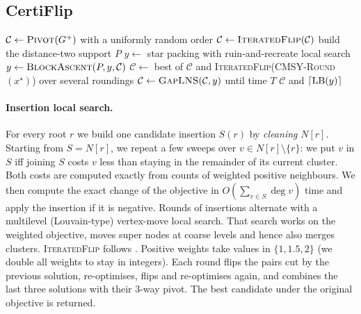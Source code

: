 \subsection{CertiFlip}\label{sec:algo}

\begin{algorithm}[t]
\caption{CertiFlip$(G^+,T)$}\label{alg:certiflip}
\begin{algorithmic}[1]
\State $\mathcal C\gets\textsc{Pivot}(G^+)$ with a uniformly random order
\State $\mathcal C\gets\textsc{IteratedFlip}(\mathcal C)$ 
\State build the distance-two support $P$
\State $y\gets$ star packing with ruin-and-recreate local search 
\State $y\gets\textsc{BlockAscent}(P,y,\mathcal C)$ 
  \State $\mathcal C\gets$ best of $\mathcal C$ and \textsc{IteratedFlip}(\textsc{CMSY-Round}$(x^\star)$) over several roundings
\EndIf
\State $\mathcal C\gets\textsc{GapLNS}(\mathcal C,y)$ until time $T$
\State \Return $\mathcal C$ and $\lceil\mathrm{LB}(y)\rceil$ 
\end{algorithmic}
\end{algorithm}

\paragraph{Insertion local search.}  For every root $r$ we build one candidate
insertion $S(r)$ by \emph{cleaning} $N[r]$.  Starting from $S=N[r]$, we
repeat a few sweeps over $v\in N[r]\setminus\{r\}$: we put $v$ in $S$ iff
joining $S$ costs $v$ less than staying in the remainder of its current
cluster.  Both costs are computed exactly from counts of weighted positive
neighbours.  We then compute the exact change of the objective in
$O(\sum_{v\in S}\deg v)$ time and apply the insertion if it is negative.
Rounds of insertions alternate with a multilevel (Louvain-type) vertex-move
local search.  That search works on the weighted objective, moves super nodes
at coarse levels and hence also merges clusters.  \textsc{IteratedFlip}
follows \citet{CohenAddadLPTYZ24}.  Positive weights take values in
$\{1,1.5,2\}$ (we double all weights to stay in integers).  Each round flips
the pairs cut by the previous solution, re-optimises, flips and re-optimises
again, and combines the last three solutions with their $3$-way pivot.  The
best candidate under the original objective is returned.

